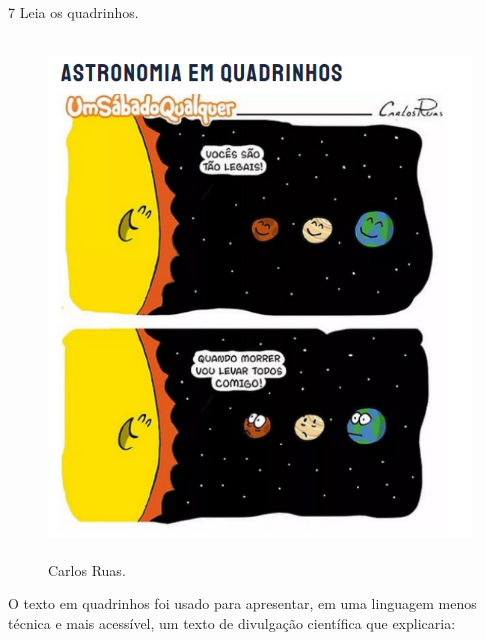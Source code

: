 

\num{7} Leia os quadrinhos.

\begin{figure}[H]
\centering\includegraphics[width=4.75833in,height=5.41291in]{./imgSAEB_6_POR/media/image12.png}
\caption{Carlos Ruas.}
\end{figure}

\noindent O texto em quadrinhos foi usado para apresentar, em uma linguagem menos
técnica e mais acessível, um texto de divulgação científica que
explicaria:

